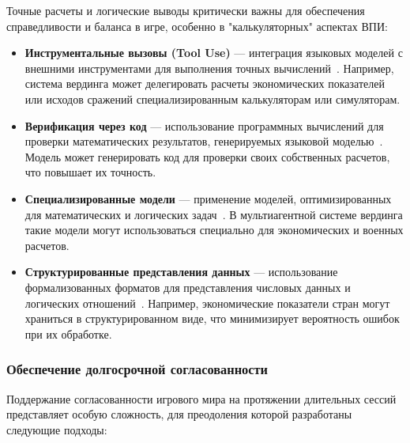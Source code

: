 Точные расчеты и логические выводы критически важны для обеспечения справедливости и баланса в игре, особенно в "{}калькуляторных"{} аспектах ВПИ:

\begin{itemize}
    \item \textbf{Инструментальные вызовы (Tool Use)} — интеграция языковых моделей с внешними инструментами для выполнения точных вычислений~\cite{schick2023toolformer}. Например, система вердинга может делегировать расчеты экономических показателей или исходов сражений специализированным калькуляторам или симуляторам.

    \item \textbf{Верификация через код} — использование программных вычислений для проверки математических результатов, генерируемых языковой моделью~\cite{cobbe2021training}. Модель может генерировать код для проверки своих собственных расчетов, что повышает их точность.

    \item \textbf{Специализированные модели} — применение моделей, оптимизированных для математических и логических задач~\cite{lewkowycz2022solving}. В мультиагентной системе вердинга такие модели могут использоваться специально для экономических и военных расчетов.

    \item \textbf{Структурированные представления данных} — использование формализованных форматов для представления числовых данных и логических отношений~\cite{ling2017program}. Например, экономические показатели стран могут храниться в структурированном виде, что минимизирует вероятность ошибок при их обработке.
\end{itemize}

\subsubsection{Обеспечение долгосрочной согласованности}

Поддержание согласованности игрового мира на протяжении длительных сессий представляет особую сложность, для преодоления которой разработаны следующие подходы:

